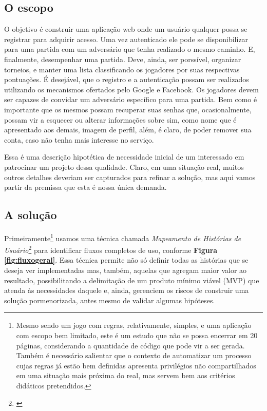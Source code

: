 \documentclass[12pt,a4paper,oneside,english,brazil]{article}
\begin{document}
    \subsection{O escopo}

      O objetivo é construir uma aplicação web onde um usuário qualquer possa se
      registrar para adquirir acesso. Uma vez autenticado ele pode se
      disponibilizar para uma partida com um adversário que tenha realizado o
      mesmo caminho. E, finalmente, desempenhar uma partida. Deve, ainda, ser
      porssível, organizar torneios, e manter uma lista classificando os
      jogadores por suas respectivas pontuações. É desejável, que o registro e a
      autenticação possam ser realizados utilizando os mecanismos ofertados pelo
      Google e Facebook. Os jogadores devem ser capazes de convidar um
      adversário específico para uma partida. Bem como é importante que os
      mesmos possam recuperar suas senhas que, ocasionalmente, possam vir a
      esquecer ou alterar informações sobre sim, como nome que é apresentado aos
      demais, imagem de perfil, além, é claro, de poder remover sua conta, caso
      não tenha mais interesse no serviço.

      Essa é uma descrição hipotética de necessidade inicial de um interessado
      em patrocinar um projeto dessa qualidade. Claro, em uma situação real,
      muitos outros detalhes deveriam ser capturados para refinar a solução, mas
      aqui vamos partir da premissa que esta é nossa única demanda.


    \subsection{A solução}

      Primeiramente\footnote{Mesmo sendo um jogo com regras, relativamente,
      simples, e uma aplicação com escopo bem limitado, este é um estudo que não
      se possa encerrar em 20 páginas, considerando a quantidade de código que
      pode vir a ser gerada. Também é necessário salientar que o contexto de
      automatizar um processo cujas regras já estão bem definidas apresenta
      privilégios não compartilhados em uma situação mais próxima do real, mas
      servem bem aos critérios didáticos pretendidos.}
      usamos uma técnica chamada
      \emph{Mapeamento de Histórias de Usuário}\footnote{\cite{Patton2014}}
      para identificar fluxos completos de uso, conforme
      \textbf{Figura \ref{fig:fluxogeral}}. Essa técnica permite não só definir
      todas as histórias que se deseja ver implementadas mas, também, aquelas
      que agregam maior valor ao resultado, possibilitando a delimitação de um
      produto mínimo viável (MVP) que atenda às necessidades daquele e, ainda,
      gerenciem os riscos de construir uma solução pormenorizada, antes mesmo de
      validar algumas hipóteses.
\end{document}
